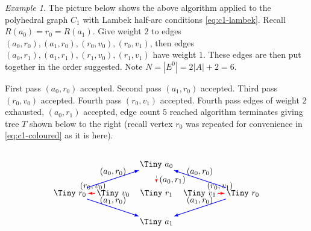 \documentclass[12pt]{amsart}
\theoremstyle{definition}
\theoremstyle{remark}
\newtheorem{example}[thm]{Example}
\numberwithin{equation}{section}
\begin{document}
\begin{example} \label{ex:treex}
The picture below shows the above algorithm applied to the polyhedral graph $C_1$ with Lambek half-arc conditions \eqref{eq:c1-lambek}. Recall $R(a_0)=r_0=R(a_1)$. Give weight $2$ to edges $(a_0,r_0),(a_1,r_0),(r_0,v_0),(r_0,v_1)$, then edges $(a_0,r_1),(a_1,r_1),(r_1,v_0),(r_1,v_1)$ have weight $1$. These edges are then put together in the order suggested. Note $N = |E^0| = 2|A| +2 = 6$.

First pass $(a_0,r_0)$ accepted. Second pass $(a_1,r_0)$ accepted. Third pass $(r_0,v_0)$ accepted. Fourth  pass $(r_0,v_1)$ accepted. Fourth pass edges of weight $2$ exhausted, $(a_0, r_1)$ accepted, edge count $5$ reached algorithm terminates giving tree $T$ shown below to the right (recall vertex $r_0$ was repeated for convenience in \eqref{eq:c1-coloured} as it is here).
\[
\begin{tikzpicture}[->=stealth,scale=0.6]

\node[inner sep=1pt,circle] (p0) at (-3,0) {\Tiny $v_0$};
\node[inner sep=1pt,circle] (p1) at (3,0) {\Tiny $v_1$};

\node[inner sep=1pt,circle] (f0) at (0,0) {\Tiny $r_1$};

\node[inner sep=1pt,circle] (lf1) at (-6,0) {\Tiny $r_0$};
\node[inner sep=1pt,circle] (rf1) at (6,0) {\Tiny $r_0$};

\node[inner sep=1pt,circle] (a1) at (0,-2) {\Tiny $a_1$};
\node[inner sep=1pt,circle] (a0) at (0,2) {\Tiny $a_0$};



\draw[dashed,red,thick,-latex] (p0) -- (lf1) node[pos=0.3,above] {\tiny\color{black}$(r_0,v_0)$};

\draw[red,dashed,thick,-latex] (p1) -- (rf1) node[pos=0.3,above] {\tiny\color{black}$(r_0,v_1)$};



\draw[thick,blue,-latex] (lf1) -- (a0) node[pos=0.5,above] {\tiny\color{black}$(a_0,r_0)$};

\draw[red,dashed,-latex] (f0) -- (a0) node[pos=0.6,right] {\tiny\color{black}$(a_0,r_1)$};




\draw[thick,blue,-latex] (lf1) -- (a1) node[pos=0.5,above] {\tiny\color{black}$(a_1,r_0)$};

\draw[thick,blue,-latex] (rf1) -- (a0) node[pos=0.5,above] {\tiny\color{black}$(a_0,r_0)$};

\draw[blue,thick,-latex] (rf1) -- (a1) node[pos=0.5,above] {\tiny\color{black}$(a_1,r_0)$};


\end{tikzpicture}\]
\end{example}
\end{document}

